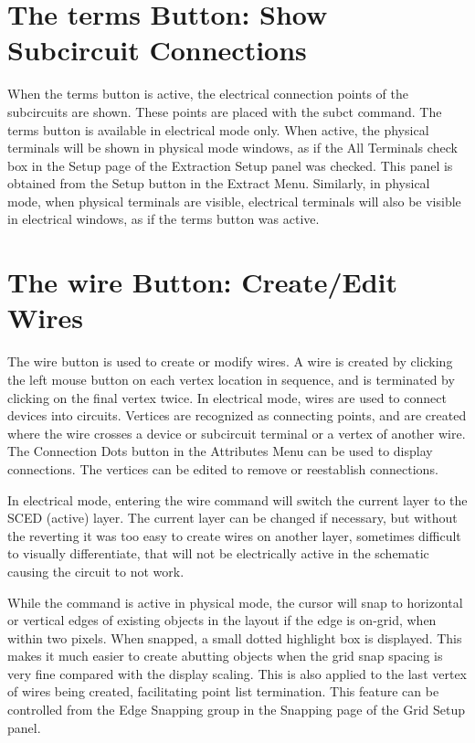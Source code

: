 \section{The {\cb terms} Button: Show Subcircuit Connections}

When the {\cb terms} button is active, the electrical connection
points of the subcircuits are shown.  These points are placed with the
{\cb subct} command.  The {\cb terms} button is available in
electrical mode only.  When active, the physical terminals will be
shown in physical mode windows, as if the {\cb All Terminals} check
box in the {\cb Setup} page of the {\cb Extraction Setup} panel was
checked.  This panel is obtained from the {\cb Setup} button in the
{\cb Extract Menu}.  Similarly, in physical mode, when physical
terminals are visible, electrical terminals will also be visible in
electrical windows, as if the {\cb terms} button was active.


\section{The {\cb wire} Button: Create/Edit Wires}

The {\cb wire} button is used to create or modify wires.  A wire is
created by clicking the left mouse button on each vertex location in
sequence, and is terminated by clicking on the final vertex twice.  In
electrical mode, wires are used to connect devices into circuits. 
Vertices are recognized as connecting points, and are created where
the wire crosses a device or subcircuit terminal or a vertex of
another wire.  The {\cb Connection Dots} button in the {\cb Attributes
Menu} can be used to display connections.  The vertices can be edited
to remove or reestablish connections.

In electrical mode, entering the {\cb wire} command will switch the
current layer to the SCED (active) layer.  The current layer can be
changed if necessary, but without the reverting it was too easy to
create wires on another layer, sometimes difficult to visually
differentiate, that will not be electrically active in the schematic
causing the circuit to not work.

While the command is active in physical mode, the cursor will snap to
horizontal or vertical edges of existing objects in the layout if the
edge is on-grid, when within two pixels.  When snapped, a small dotted
highlight box is displayed.  This makes it much easier to create
abutting objects when the grid snap spacing is very fine compared with
the display scaling.  This is also applied to the last vertex of wires
being created, facilitating point list termination.  This feature can
be controlled from the {\cb Edge Snapping} group in the {\cb Snapping}
page of the {\cb Grid Setup} panel.

